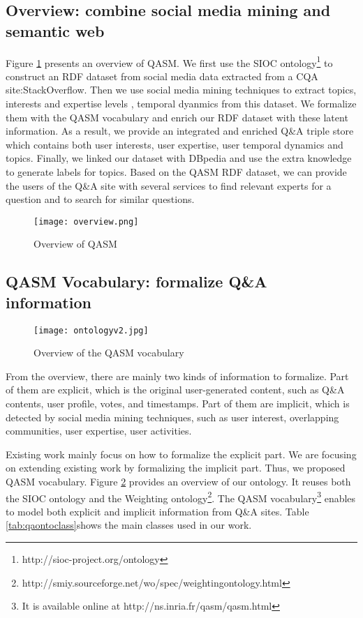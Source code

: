 \subsection{Overview: combine social media mining and semantic web}
Figure \ref{fig:overview} presents an overview of QASM. We first use the SIOC ontology\footnote{http://sioc-project.org/ontology} to construct an RDF dataset from social media data extracted from a CQA site:StackOverflow. Then we use social media mining techniques to extract topics, interests and expertise levels , temporal dyanmics from this dataset. We formalize them with the QASM vocabulary and enrich our RDF dataset with these latent information. As a result, we provide an integrated and enriched Q\&A triple store which contains both user interests, user expertise, user temporal dynamics and topics. Finally, we linked our dataset with DBpedia and use the extra knowledge to generate labels for topics. Based on the QASM RDF dataset, we can provide the users of the Q\&A site with several services to find relevant experts for a question and to search for similar questions.

\begin{figure}%
\centering
\texttt{[image: overview.png]}  
\caption{Overview of QASM}
\label{fig:overview} 
\end{figure}

\subsection{QASM Vocabulary: formalize Q\&A information}
\begin{figure}[htbp]
\centering
\texttt{[image: ontologyv2.jpg]}  
\caption{Overview of the QASM vocabulary}
\label{fig:coreontology} 
\end{figure}

From the overview, there are mainly two kinds of information to formalize. Part of them are explicit, which is the original user-generated content, such as Q\&A contents, user profile, votes, and timestamps. Part of them are implicit, which is detected by social media mining techniques, such as user interest, overlapping communities, user expertise, user activities. 

Existing work mainly focus on how to formalize the explicit part. We are focusing on extending existing work by formalizing the implicit part. Thus, we proposed QASM vocabulary. Figure \ref{fig:coreontology} provides an overview of our ontology. It reuses both the SIOC ontology and the Weighting ontology\footnote{http://smiy.sourceforge.net/wo/spec/weightingontology.html}.
The QASM vocabulary\footnote{It is available online at http://ns.inria.fr/qasm/qasm.html} enables to model both explicit and implicit information from Q\&A sites. Table \ref{tab:qaontoclass}shows the main classes used in our work.


